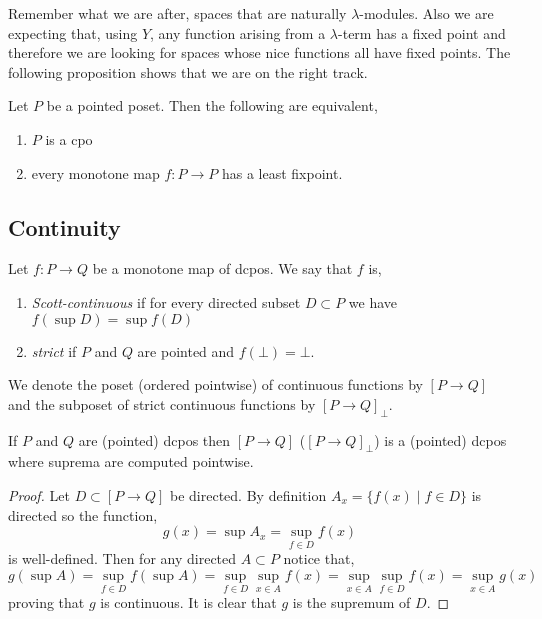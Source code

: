 \documentclass[12pt]{article}
\begin{document}
\begin{rmk}
Remember what we are after, spaces that are naturally $\lambda$-modules. Also we are expecting that, using $Y$, any function arising from a $\lambda$-term has a fixed point and therefore we are looking for spaces whose nice functions all have fixed points. The following proposition shows that we are on the right track. 
\end{rmk}

\begin{prop}
Let $P$ be a pointed poset. Then the following are equivalent,
\begin{enumerate}
\item $P$ is a cpo
\item every monotone map $f : P \to P$ has a least fixpoint.  
\end{enumerate}
\end{prop}

\subsection{Continuity}

\begin{defn}
Let $f : P \to Q$ be a monotone map of dcpos. We say that $f$ is,
\begin{enumerate}
\item \textit{Scott-continuous} if for every directed subset $D \subset P$ we have $f(\sup D) = \sup f(D)$
\item \textit{strict} if $P$ and $Q$ are pointed and $f(\bot) = \bot$.
\end{enumerate}
We denote the poset (ordered pointwise) of continuous functions by $[P \to Q]$ and the subposet of strict continuous functions by $[P \to Q]_{\bot}$.
\end{defn}

\begin{prop}
If $P$ and $Q$ are (pointed) dcpos then $[P \to Q]$ ($[P \to Q]_{\bot}$) is a (pointed) dcpos where suprema are computed pointwise. 
\end{prop}

\begin{proof}
Let $D \subset [P \to Q]$ be directed. By definition $A_x = \{ f(x) \mid f \in D \}$ is directed so the function,
\[ g(x) = \sup A_x = \sup_{f \in D} f(x) \]
is well-defined. Then for any directed $A \subset P$ notice that,
\[ g(\sup A) = \sup_{f \in D} f(\sup A) = \sup_{f \in D} \sup_{x \in A} f(x) = \sup_{x \in A} \sup_{f \in D} f(x) = \sup_{x \in A} g(x) \]
proving that $g$ is continuous. It is clear that $g$ is the supremum of $D$. 
\end{proof}
\end{document}
